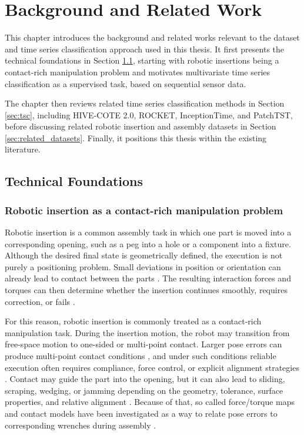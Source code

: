 \chapter{Background and Related Work} \label{ch:state-of-the-art}
This chapter introduces the background and related works relevant to the dataset and time series classification approach used in this thesis. It first presents the technical foundations in Section \ref{sec:tech_foundations}, starting with robotic insertions being a contact-rich manipulation problem and motivates multivariate time series classification as a supervised task, based on sequential sensor data.

The chapter then reviews related time series classification methods in Section \ref{sec:tsc}, including HIVE-COTE 2.0, ROCKET, InceptionTime, and PatchTST, before discussing related robotic insertion and assembly datasets in Section \ref{sec:related_datasets}. Finally, it positions this thesis within the existing literature.

\section{Technical Foundations}\label{sec:tech_foundations}

\subsection{Robotic insertion as a contact-rich manipulation problem}

Robotic insertion is a common assembly task in which one part is moved into a corresponding opening, such as a peg into a hole or a component into a fixture. Although the desired final state is geometrically defined, the execution is not purely a positioning problem. Small deviations in position or orientation can already lead to contact between the parts \cite{xuCompareContactModelbased2019,tangAutonomousAlignmentPeg2016}. The resulting interaction forces and torques can then determine whether the insertion continues smoothly, requires correction, or fails \cite{raibertHybridPositionForce1981b,whitneyHistoricalPerspectiveState1987,feiContactJammingAnalysis2004b}.

For this reason, robotic insertion is commonly treated as a contact-rich manipulation task. During the insertion motion, the robot may transition from free-space motion to one-sided or multi-point contact. Larger pose errors can produce multi-point contact conditions \cite{tangAutonomousAlignmentPeg2016}, and under such conditions reliable execution often requires compliance, force control, or explicit alignment strategies \cite{raibertHybridPositionForce1981b,whitneyHistoricalPerspectiveState1987,xuCompareContactModelbased2019}. Contact may guide the part into the opening, but it can also lead to sliding, scraping, wedging, or jamming depending on the geometry, tolerance, surface properties, and relative alignment \cite{feiContactJammingAnalysis2004b,wangContactForceTorque2018,beltran-hernandezLearningForceControl2020}. Because of that, so called force/torque maps and contact models have been investigated as a way to relate pose errors to corresponding wrenches during assembly \cite{dietrichContactModelsAssembly2010,abdullahForceTorqueData2015}.


